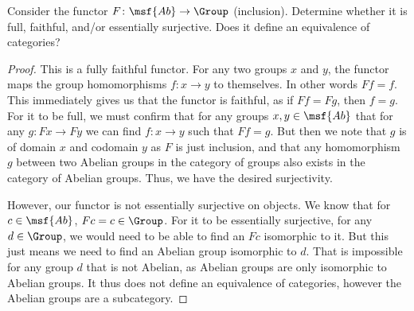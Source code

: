 \documentclass[main.tex]{subfiles}
\begin{document}
\maketitle
%

\begin{exercise}
	Consider the functor $F\colon \msf{Ab} \rightarrow \Group$ (inclusion).  Determine whether it is full, faithful, and/or essentially surjective.  Does it define an equivalence of categories?
\end{exercise}

\begin{proof}
	This is a fully faithful functor. For any two groups $x$ and $y$, the functor maps the group homomorphisms $f\colon x \rightarrow y$ to themselves.  In other words $Ff = f$.  This immediately gives us that the functor is faithful, as if $Ff = Fg$, then $f = g$.  
For it to be full, we must confirm that for any groups $x,y \in \msf{Ab}$ that for any $g\colon Fx \rightarrow Fy$ we can find $f\colon x \rightarrow y$ such that $Ff = g$.  But then we note that $g$ is of domain $x$ and codomain $y$ as $F$ is just inclusion, and that any homomorphism $g$ between two Abelian groups in the category of groups
also exists in the category of Abelian groups.  Thus, we have the desired surjectivity.


However, our functor is not essentially surjective on objects.  We know that for $c \in \msf{Ab}$, $Fc = c \in\Group$.  For it to be essentially surjective, for any $d \in \Group$, we would need to be able to find an $Fc$ isomorphic to it.  But this just means we need to find an Abelian group isomorphic to $d$.  That is impossible for any group $d$ that is not Abelian, as Abelian groups are only isomorphic to Abelian groups. It thus does not define an equivalence of categories, however the Abelian groups are a subcategory. 
\end{proof}
\end{document}
